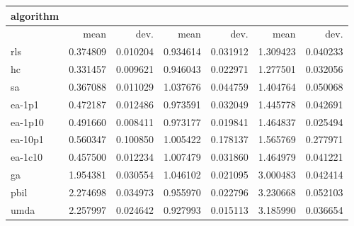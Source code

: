 \begin{tabular}{@{}l*{6}{>{{}}N{1}{2}}@{}}
\toprule
{algorithm} &  &  &  \\
\midrule
& {mean} & {dev.} & {mean} & {dev.} & {mean} & {dev.} \\
\midrule
rls & 0.374809 & 0.010204 & 0.934614 & 0.031912 & 1.309423 & 0.040233 \\
 hc & 0.331457 & 0.009621 & 0.946043 & 0.022971 & 1.277501 & 0.032056 \\
 sa & 0.367088 & 0.011029 & 1.037676 & 0.044759 & 1.404764 & 0.050068 \\
 ea-1p1 & 0.472187 & 0.012486 & 0.973591 & 0.032049 & 1.445778 & 0.042691 \\
 ea-1p10 & 0.491660 & 0.008411 & 0.973177 & 0.019841 & 1.464837 & 0.025494 \\
 ea-10p1 & 0.560347 & 0.100850 & 1.005422 & 0.178137 & 1.565769 & 0.277971 \\
 ea-1c10 & 0.457500 & 0.012234 & 1.007479 & 0.031860 & 1.464979 & 0.041221 \\
 ga & 1.954381 & 0.030554 & 1.046102 & 0.021095 & 3.000483 & 0.042414 \\
 pbil & 2.274698 & 0.034973 & 0.955970 & 0.022796 & 3.230668 & 0.052103 \\
 umda & 2.257997 & 0.024642 & 0.927993 & 0.015113 & 3.185990 & 0.036654 \\
 \bottomrule
\end{tabular}
